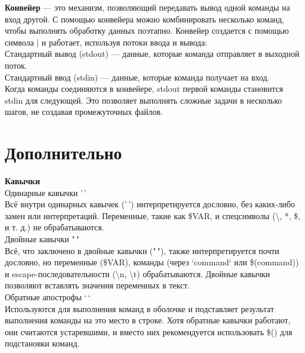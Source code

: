 \textbf{Конвейер} — это механизм, позволяющий передавать вывод одной команды на вход другой. С помощью конвейера можно комбинировать несколько команд, чтобы выполнять обработку данных поэтапно. Конвейер создается с помощью символа | и работает, используя потоки ввода и вывода: \\
Стандартный вывод (stdout) — данные, которые команда отправляет в выходной поток. \\
Стандартный ввод (stdin) — данные, которые команда получает на вход. \\
Когда команды соединяются в конвейере, stdout первой команды становится stdin для следующей. Это позволяет выполнять сложные задачи в несколько шагов, не создавая промежуточных файлов. \\

\section{Дополнительно}
\noindent \textbf{Кавычки} \\
Одинарные кавычки '\,' \\
Всё внутри одинарных кавычек ('\,') интерпретируется дословно, без каких-либо замен или интерпретаций. Переменные, такие как \$VAR, и спецсимволы (\textbackslash, *, \$, и т. д.) не обрабатываются. \\
Двойные кавычки "\,"  \\
Всё, что заключено в двойные кавычки ("\,"), также интерпретируется почти дословно, но переменные (\$VAR), команды (через `command` или \$(command)) и escape-последовательности (\textbackslash n, \textbackslash t) обрабатываются. Двойные кавычки позволяют вставлять значения переменных в текст. \\
Обратные апострофы `\,` \\
Используются для выполнения команд в оболочке и подставляет результат выполнения команды на это место в строке. Хотя обратные кавычки работают, они считаются устаревшими, и вместо них рекомендуется использовать \$() для подстановки команд. \\

